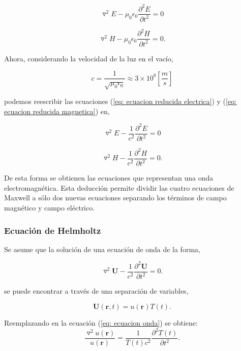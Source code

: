 \documentclass[12pt,letterpaper]{article}
\numberwithin{equation}{section}
\begin{document}
\begin{equation}
	\triangledown^2E - \mu_0\epsilon_0\frac{\partial^2E}{\partial t^2}= 0
	\label{eq: ecuacion reducida electrica}
\end{equation}

\begin{equation}
\triangledown^2H - \mu_0\epsilon_0\frac{\partial^2H}{\partial t^2}= 0.
\label{eq: ecuacion reducida magnetica}
\end{equation}

Ahora, considerando la velocidad de la luz en el vacío,

$$c = \frac{1}{\sqrt{\mu_0\epsilon_0}} \approx 3\times10^8\left[\frac{m}{s}\right]$$

podemos reescribir las ecuaciones (\ref{eq: ecuacion reducida electrica}) y (\ref{eq: ecuacion reducida magnetica}) en,

\begin{equation}
\triangledown^2E - \frac{1}{c^2}\frac{\partial^2E}{\partial t^2}= 0
\label{eq: ecuacion onda electrica}
\end{equation}

\begin{equation}
\triangledown^2H - \frac{1}{c^2}\frac{\partial^2H}{\partial t^2}= 0.
\label{eq: ecuacion onda magnetica}
\end{equation}
  
De esta forma se obtienen las ecuaciones que representan una onda electromagnética. Esta deducción permite dividir las cuatro ecuaciones de Maxwell a sólo dos nuevas ecuaciones separando los términos de campo magnético y campo eléctrico. 

\subsubsection{Ecuación de Helmholtz}
Se asume que la solución de una ecuación de onda de la forma,

\begin{equation}
\triangledown^2\textbf{U} - \frac{1}{c^2}\frac{\partial^2\textbf{U}}{\partial t^2}= 0.
\label{eq: ecuacion onda}
\end{equation} 
 
se puede encontrar a través de una separación de variables,

$$\textbf{U}(\textbf{r},t)=u(\textbf{r})T(t).$$

Reemplazando en la ecuación (\ref{eq: ecuacion onda}) se obtiene:
\begin{equation}
	\frac{\triangledown^2u(\textbf{r})}{u(\textbf{r})} = \frac{1}{T(t)c^2}\frac{\partial^2T(t)}{\partial t^2}.
	\label{eq: antes Helmholtz}
\end{equation}
\end{document}
